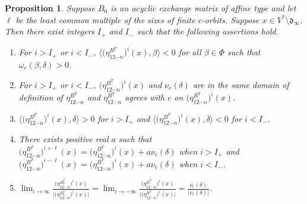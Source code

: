 \documentclass{amsart}
\newtheorem{proposition}{Proposition}[section]
\theoremstyle{definition}
\theoremstyle{remark}
\numberwithin{equation}{section}
\newcommand{\br}[1]{{\langle #1 \rangle}}
\newcommand{\brr}[1]{{\bigl\langle #1 \bigr\rangle}}
\newcommand{\F}{{\mathcal F}}
\newcommand{\0}{{\mathbf{0}}}
\renewcommand{\d}{{\mathfrak d}}
\newcommand{\RSChar}{\Phi}
\newcommand{\RS}{\RSChar}
\newcommand{\AP}[1]{\RS_{#1}}
\begin{document}
%
\begin{proposition}\label{delta limit eta}
Suppose $B_0$ is an acyclic exchange matrix of affine type and let~$\ell$ be the least common multiple of the sizes of finite $c$-orbits.
Suppose $x\in V^*\setminus\d_\infty$.
Then there exist integers $I_+$ and $I_-$ such that the following assertions hold.
\begin{enumerate}[label=\bf\arabic*., ref=\arabic*]
\item \label{in big dinf}
For $i>I_+$ or $i<I_-$, $\br{\bigl(\eta_{12\cdots n}^{B^T}\bigr)^i(x),\beta}<0$ for all $\beta\in\RS$ such that $\omega_c(\beta,\delta)>0$.
\item \label{c agree}
For $i>I_+$ or $i<I_-$, $\bigl(\eta_{12\cdots n}^{B^T}\bigr)^i(x)$ and $\nu_c(\delta)$ are in the same domain of definition of $\eta_{12\cdots n}^{B^T}$ and $\eta_{12\cdots n}^{B^T}$ agrees with $c$ on $\bigl(\eta_{12\cdots n}^{B^T}\bigr)^i(x)$.
\item \label{correct side}
$\brr{\bigl(\eta_{12\cdots n}^{B^T}\bigr)^i(x),\delta}>0$ for $i>I_+$ and $\brr{\bigl(\eta_{12\cdots n}^{B^T}\bigr)^i(x),\delta}<0$ for $i<I_-$.
\item \label{pos a}
There exists positive real $a$ such that $\bigl(\eta_{12\cdots n}^{B^T}\bigr)^{i+\ell}(x)=\bigl(\eta_{12\cdots n}^{B^T}\bigr)^i(x)+a\nu_c(\delta)$ when $i>I_+$ and $\bigl(\eta_{12\cdots n}^{B^T}\bigr)^{i-\ell}(x)=\bigl(\eta_{12\cdots n}^{B^T}\bigr)^i(x)+a\nu_c(\delta)$ when $i<I_-$.
\item \label{eta lim}
$\displaystyle\lim_{i\to\infty}\frac{\bigl(\eta_{12\cdots n}^{B_0^T}\bigr)^i(x)}{\bigl|\bigl(\eta_{12\cdots n}^{B_0^T}\bigr)^i(x)\bigr|}=\lim_{i\to-\infty}\frac{\bigl(\eta_{12\cdots n}^{B^T}\bigr)^i(x)}{\bigl|\bigl(\eta_{12\cdots n}^{B^T}\bigr)^i(x)\bigr|}=\frac{\nu_c(\delta)}{|\nu_c(\delta)|}$.
\end{enumerate}
\end{proposition}
\end{document}
